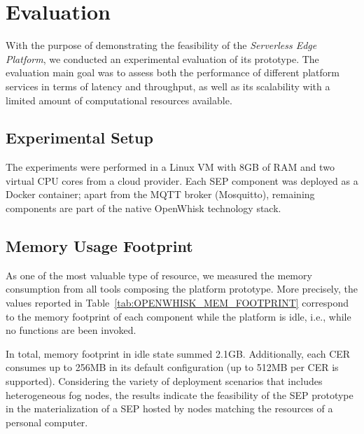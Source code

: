 \section{Evaluation}\label{sec:evaluation}

With the purpose of demonstrating the feasibility of the \textit{Serverless Edge Platform}, we conducted an experimental evaluation of its prototype. The evaluation main goal was to assess both the performance of different platform services in terms of latency and throughput, as well as its scalability with a limited amount of computational resources available. 

\subsection{Experimental Setup}

The experiments were performed in a Linux VM with 8GB of RAM and two virtual CPU cores from a cloud provider. Each SEP component was deployed as a Docker container; apart from the MQTT broker (Mosquitto), remaining components are part of the native OpenWhisk technology stack.

\subsection{Memory Usage Footprint}

As one of the most valuable type of resource, we measured the memory consumption from all tools composing the platform prototype. More precisely, the values reported in Table~\ref{tab:OPENWHISK_MEM_FOOTPRINT} correspond to the memory footprint of each component while the platform is idle, i.e., while no functions are been invoked.

In total, memory footprint in idle state summed  2.1GB. Additionally, each CER consumes up to 256MB in its default configuration (up to 512MB per CER is supported). Considering the variety of deployment scenarios that includes heterogeneous fog nodes, the results indicate the feasibility of the SEP prototype in the materialization of a SEP hosted by nodes matching the resources of a personal computer. 



